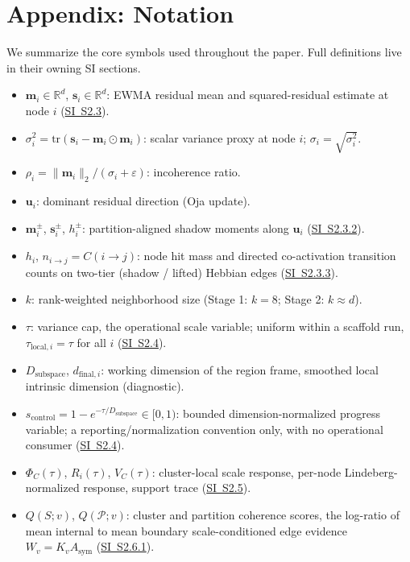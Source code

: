 \documentclass[11pt]{article}
\theoremstyle{definition}
\theoremstyle{plain}
\begin{document}
\section*{Appendix: Notation}
We summarize the core symbols used throughout the paper. Full definitions live in their owning SI sections.
\begin{itemize}[leftmargin=1.5em]
    \item $\mathbf m_i\in\mathbb R^d$, $\mathbf s_i\in\mathbb R^d$: EWMA residual mean and squared-residual estimate at node $i$ (\hyperref[sec:si-dual-rate-motion]{SI~S2.3}).
    \item $\sigma_i^2=\mathrm{tr}(\mathbf s_i-\mathbf m_i\odot\mathbf m_i)$: scalar variance proxy at node $i$; $\sigma_i=\sqrt{\sigma_i^2}$.
    \item $\rho_i=\|\mathbf m_i\|_2/(\sigma_i+\varepsilon)$: incoherence ratio.
    \item $\mathbf u_i$: dominant residual direction (Oja update).
    \item $\mathbf m_i^\pm$, $\mathbf s_i^\pm$, $h_i^\pm$: partition-aligned shadow moments along $\mathbf u_i$ (\hyperref[sec:si-shadow-moments]{SI~S2.3.2}).
    \item $h_i$, $n_{i\to j}=C(i\!\to\! j)$: node hit mass and directed co-activation transition counts on two-tier (shadow / lifted) Hebbian edges (\hyperref[sec:si-two-tier-edges]{SI~S2.3.3}).
    \item $k$: rank-weighted neighborhood size (Stage 1: $k=8$; Stage 2: $k\approx d$).
    \item $\tau$: variance cap, the operational scale variable; uniform within a scaffold run, $\tau_{\mathrm{local},i}=\tau$ for all $i$ (\hyperref[sec:si-dual-rate-motion]{SI~S2.4}).
    \item $D_{\mathrm{subspace}}$, $d_{\mathrm{final},i}$: working dimension of the region frame, smoothed local intrinsic dimension (diagnostic).
    \item $s_{\mathrm{control}}=1-e^{-\tau/D_{\mathrm{subspace}}}\in[0,1)$: bounded dimension-normalized progress variable; a reporting/normalization convention only, with no operational consumer (\hyperref[sec:si-dual-rate-motion]{SI~S2.4}).
    \item $\Phi_C(\tau)$, $R_i(\tau)$, $V_C(\tau)$: cluster-local scale response, per-node Lindeberg-normalized response, support trace (\hyperref[sec:si-scale-response]{SI~S2.5}).
    \item $Q(S;v)$, $Q(\mathcal P;v)$: cluster and partition coherence scores, the log-ratio of mean internal to mean boundary scale-conditioned edge evidence $W_v=K_v A_{\mathrm{sym}}$ (\hyperref[sec:si-cluster-derivation]{SI~S2.6.1}).

\end{itemize}
\end{document}
